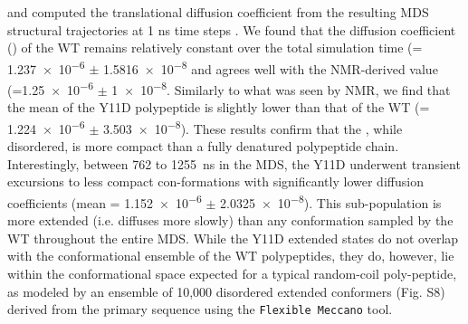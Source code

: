  and computed the translational diffusion coefficient from the resulting MDS structural trajectories at 1 ns time steps . We found that the diffusion coefficient (\diffusion) of the WT \gct{} remains relatively constant over the total simulation time (\diffusion = \num{1.237e-6} $\pm$ \SI{1.5816e-8}{\dcunits} and agrees well with the NMR-derived value (\diffusion=\num{1.25e-6} $\pm$  \SI{1e-8}{\dcunits}.  Similarly to what was seen by NMR, we find that the mean \diffusion of the Y11D \gct{} polypeptide is slightly lower than that of the WT \gct{} (\diffusion= \num{1.224e-6} $\pm$ \SI{3.503e-8}{\dcunits}). These results confirm that the \gct{}, while disordered, is more compact than a fully denatured polypeptide chain. Interestingly, between \num{762} to \SI{1255}{\ns} in the MDS, the Y11D \gct{} underwent transient excursions to less compact con-formations with significantly lower diffusion coefficients (mean \diffusion{}= \num{1.152e-6} $\pm$ \SI{2.0325e-8}{\dcunits}). This sub-population is more extended (i.e. diffuses more slowly) than any conformation sampled by the WT \gct{} throughout the entire MDS. While the Y11D \gct{} extended states do not overlap with the conformational ensemble of the WT \gct{} polypeptides, they do, however, lie within the conformational space expected for a typical random-coil poly-peptide, as modeled by an ensemble of 10,000 disordered extended conformers (Fig. S8) derived from the \gct{} primary sequence using the \texttt{Flexible Meccano} tool.  

